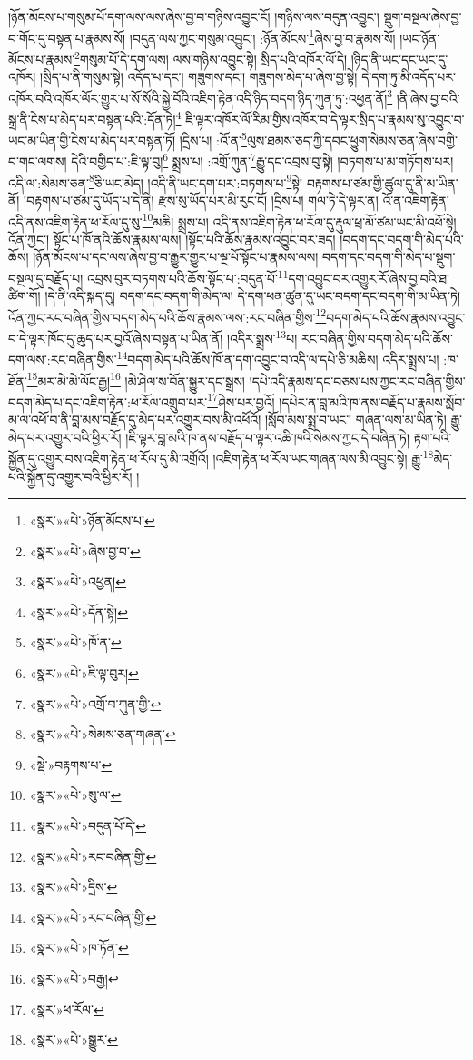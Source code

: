 །ཉོན་མོངས་པ་གསུམ་པོ་དག་ལས་ལས་ཞེས་བྱ་བ་གཉིས་འབྱུང་ངོ། །གཉིས་ལས་བདུན་འབྱུང་། སྡུག་བསྔལ་ཞེས་བྱ་བ་གོང་དུ་བསྟན་པ་རྣམས་སོ། །བདུན་ལས་ཀྱང་གསུམ་འབྱུང་། :ཉོན་མོངས་\footnote{«སྣར་»«པེ་»ཉོན་མོངས་པ་}ཞེས་བྱ་བ་རྣམས་སོ། །ཡང་ཉོན་མོངས་པ་རྣམས་\footnote{«སྣར་»«པེ་»ཞེས་བྱ་བ་}གསུམ་པོ་དེ་དག་ལས། ལས་གཉིས་འབྱུང་སྟེ། སྲིད་པའི་འཁོར་ལོ་དེ། །ཉིད་ནི་ཡང་དང་ཡང་དུ་འཁོར། །སྲིད་པ་ནི་གསུམ་སྟེ། འདོད་པ་དང་། གཟུགས་དང་། གཟུགས་མེད་པ་ཞེས་བྱ་སྟེ། དེ་དག་ཏུ་མི་འདོད་པར་འཁོར་བའི་འཁོར་ལོར་གྱུར་པ་སོ་སོའི་སྐྱེ་བོའི་འཇིག་རྟེན་འདི་ཉིད་བདག་ཉིད་ཀུན་ཏུ་:འཕྱན་ནོ།\footnote{«སྣར་»«པེ་»འཕྱན།} །ནི་ཞེས་བྱ་བའི་སྒྲ་ནི་ངེས་པ་མེད་པར་བསྟན་པའི་:དོན་ཏེ།\footnote{«སྣར་»«པེ་»དོན་སྟེ།} ཇི་ལྟར་འཁོར་ལོ་རིམ་གྱིས་འཁོར་བ་དེ་ལྟར་སྲིད་པ་རྣམས་སུ་འབྱུང་བ་ཡང་མ་ཡིན་གྱི་ངེས་པ་མེད་པར་བསྟན་ཏོ། །དྲིས་པ། :འོ་ན་\footnote{«སྣར་»«པེ་»ཁོ་ན་}ལུས་ཐམས་ཅད་ཀྱི་དབང་ཕྱུག་སེམས་ཅན་ཞེས་བགྱི་བ་གང་ལགས། དེའི་བགྱིད་པ་:ཇི་ལྟ་བུ།\footnote{«སྣར་»«པེ་»ཇི་ལྟ་བུར།} སྨྲས་པ། :འགྲོ་ཀུན་\footnote{«སྣར་»«པེ་»འགྲོ་བ་ཀུན་གྱི་}རྒྱུ་དང་འབྲས་བུ་སྟེ། །བཏགས་པ་མ་གཏོགས་པར། འདི་ལ་:སེམས་ཅན་\footnote{«སྣར་»«པེ་»སེམས་ཅན་གཞན་}ཅི་ཡང་མེད། །འདི་ནི་ཡང་དག་པར་:བཏགས་པ་\footnote{«སྡེ་»བརྟགས་པ་}སྟེ། བརྟགས་པ་ཙམ་གྱི་ཚུལ་དུ་ནི་མ་ཡིན་ནོ། །བརྟགས་པ་ཙམ་དུ་ཡོད་པ་དེ་ནི། རྫས་སུ་ཡོད་པར་མི་རུང་ངོ། །དྲིས་པ། གལ་ཏེ་དེ་ལྟར་ན། འོ་ན་འཇིག་རྟེན་འདི་ནས་འཇིག་རྟེན་ཕ་རོལ་དུ་སུ་\footnote{«སྣར་»«པེ་»སུ་ལ་}མཆི། སྨྲས་པ། འདི་ནས་འཇིག་རྟེན་ཕ་རོལ་དུ་རྡུལ་ཕྲ་མོ་ཙམ་ཡང་མི་འཕོ་སྟེ། འོན་ཀྱང་། སྟོང་པ་ཁོ་ནའི་ཆོས་རྣམས་ལས། །སྟོང་པའི་ཆོས་རྣམས་འབྱུང་བར་ཟད། །བདག་དང་བདག་གི་མེད་པའི་ཆོས། །ཉོན་མོངས་པ་དང་ལས་ཞེས་བྱ་བ་རྒྱུར་གྱུར་པ་ལྔ་པོ་སྟོང་པ་རྣམས་ལས། བདག་དང་བདག་གི་མེད་པ་སྡུག་བསྔལ་དུ་བརྗོད་པ། འབྲས་བུར་བཏགས་པའི་ཆོས་སྟོང་པ་:བདུན་པོ་\footnote{«སྣར་»«པེ་»བདུན་པོ་དེ་}དག་འབྱུང་བར་འགྱུར་རོ་ཞེས་བྱ་བའི་ཐ་ཚིག་གོ། །དེ་ནི་འདི་སྐད་དུ། བདག་དང་བདག་གི་མེད་ལ། དེ་དག་ཕན་ཚུན་དུ་ཡང་བདག་དང་བདག་གི་མ་ཡིན་ཏེ། འོན་ཀྱང་རང་བཞིན་གྱིས་བདག་མེད་པའི་ཆོས་རྣམས་ལས་:རང་བཞིན་གྱིས་\footnote{«སྣར་»«པེ་»རང་བཞིན་གྱི་}བདག་མེད་པའི་ཆོས་རྣམས་འབྱུང་བ་དེ་ལྟར་ཁོང་དུ་ཆུད་པར་བྱའོ་ཞེས་བསྟན་པ་ཡིན་ནོ། །འདིར་སྨྲས་\footnote{«སྣར་»«པེ་»དྲིས་}པ། རང་བཞིན་གྱིས་བདག་མེད་པའི་ཆོས་དག་ལས་:རང་བཞིན་གྱིས་\footnote{«སྣར་»«པེ་»རང་བཞིན་གྱི་}བདག་མེད་པའི་ཆོས་ཁོ་ན་དག་འབྱུང་བ་འདི་ལ་དཔེ་ཅི་མཆིས། འདིར་སྨྲས་པ། :ཁ་ཐོན་\footnote{«སྣར་»«པེ་»ཁ་ཏོན་}མར་མེ་མེ་ལོང་རྒྱ།\footnote{«སྣར་»«པེ་»བརྒྱ།} །མེ་ཤེལ་ས་བོན་སྐྱུར་དང་སྒྲས། །དཔེ་འདི་རྣམས་དང་བཅས་པས་ཀྱང་རང་བཞིན་གྱིས་བདག་མེད་པ་དང་འཇིག་རྟེན་:ཕ་རོལ་འགྲུབ་པར་\footnote{«སྣར་»ཕ་རོལ་}ཤེས་པར་བྱའོ། །དཔེར་ན་བླ་མའི་ཁ་ནས་བརྗོད་པ་རྣམས་སློབ་མ་ལ་འཕོ་བ་ནི་བླ་མས་བརྗོད་དུ་མེད་པར་འགྱུར་བས་མི་འཕོའོ། །སློབ་མས་སྨྲ་བ་ཡང་། གཞན་ལས་མ་ཡིན་ཏེ། རྒྱུ་མེད་པར་འགྱུར་བའི་ཕྱིར་རོ། །ཇི་ལྟར་བླ་མའི་ཁ་ནས་བརྗོད་པ་ལྟར་འཆི་ཁའི་སེམས་ཀྱང་དེ་བཞིན་ཏེ། རྟག་པའི་སྐྱོན་དུ་འགྱུར་བས་འཇིག་རྟེན་ཕ་རོལ་དུ་མི་འགྲོའོ། །འཇིག་རྟེན་ཕ་རོལ་ཡང་གཞན་ལས་མི་འབྱུང་སྟེ། རྒྱུ་\footnote{«སྣར་»«པེ་»སྒྱུར་}མེད་པའི་སྐྱོན་དུ་འགྱུར་བའི་ཕྱིར་རོ། །
